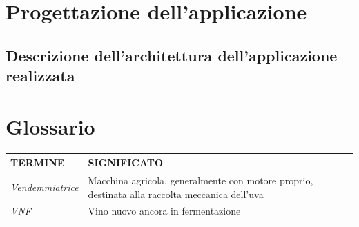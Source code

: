 \documentclass{article}
\begin{document}
\section{Progettazione dell'applicazione}
\subsection{Descrizione dell'architettura dell'applicazione realizzata}

\section{Glossario}
\begin{tabular}{lp{}}\hline
     \textbf{TERMINE} & \textbf{SIGNIFICATO} \\\hline
     \textit{Vendemmiatrice} & Macchina agricola, generalmente con motore proprio, destinata alla raccolta meccanica dell'uva  \\ \hline
     \textit{VNF} & Vino nuovo ancora in fermentazione  
\end{tabular}
 
\end{document}
